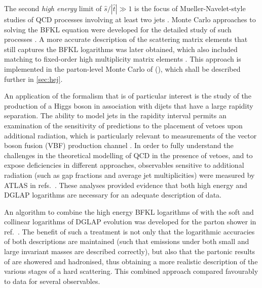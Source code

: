 The second \textit{high energy} limit of $\hat s/|\hat t|\gg 1$ is the focus of
Mueller-Navelet-style studies of QCD processes involving at
least two jets \cite{Mueller:1986ey}. Monte Carlo approaches to solving the BFKL equation were developed for the detailed study of
such processes \cite{Orr:1997im,Orr:1998ps}. A more accurate description of the scattering matrix
elements that still captures the BFKL logarithms was later obtained, which also 
included matching to fixed-order high multiplicity matrix
elements \cite{Andersen:2009nu,Andersen:2009he,Andersen:2011hs}. 
This approach
is implemented in the parton-level Monte Carlo of \HIGHEJ (\HEJ), 
which shall be described further in \cref{sec:hej}. 

An application of the \HEJ formalism that is of particular interest is the study
of the production of a Higgs boson in association with dijets that have a
large rapidity separation. 
The ability to model jets in the rapidity interval
permits an examination of the sensitivity of predictions
to the placement of vetoes upon additional radiation, 
which is particularly relevant to measurements
of the vector boson fusion (VBF) production channel \cite{DelDuca:2001fn,Klamke:2007cu,Andersen:2010zx}.
In order to fully understand the challenges in the theoretical modelling of QCD in the presence of vetoes,
and to expose deficiencies in different approaches, observables sensitive to additional radiation 
(such as gap fractions and average jet multiplicities) were measured by ATLAS in refs.~\cite{Aad:2011jz,Aad:2014pua}.
These analyses provided evidence that both high energy and DGLAP logarithms are necessary for 
an adequate description of data.

An algorithm to combine the high energy BFKL logarithms of \HEJ with the soft and collinear logarithms of DGLAP evolution 
was developed for the parton shower \ariadne \cite{Lonnblad:1992tz} in ref.~\cite{Andersen:2011zd}. 
The benefit of such a treatment is not only that the logarithmic accuracies of both descriptions are maintained (such
that emissions under both small and large invariant masses are described
correctly), but also that the partonic results of \HEJ are showered and
hadronised, thus obtaining a more realistic description of the various
stages of a hard scattering. This combined approach compared favourably to
data for several observables. 

